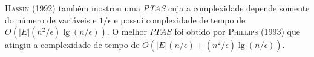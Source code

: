 \documentclass[10pt,a4paper]{article}
\begin{document}
\textsc{Hassin (1992)} também mostrou uma \emph{PTAS} cuja a 
complexidade depende somente do número de variáveis e $1/\epsilon$ e 
possui complexidade de tempo de $O(|E|(n^2/\epsilon)\lg(n/\epsilon))$.
O melhor $PTAS$ foi obtido por \textsc{Phillips (1993)} que atingiu a 
complexidade de tempo de $O(|E|(n/\epsilon) + 
(n^2/\epsilon)\lg(n/\epsilon))$.
\end{document}
